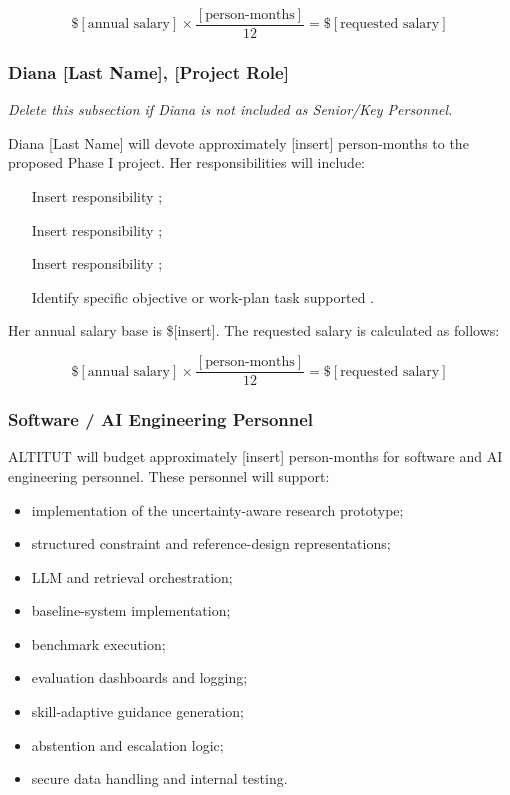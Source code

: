 \documentclass[11pt,letterpaper]{article}
\begin{document}
\[
\$[\text{annual salary}]
\times
\frac{[\text{person-months}]}{12}
=
\$[\text{requested salary}]
\]

\subsubsection*{Diana [Last Name], [Project Role]}

\textit{Delete this subsection if Diana is not included as Senior/Key
Personnel.}

Diana [Last Name] will devote approximately [insert] person-months to the
proposed Phase I project. Her responsibilities will include:

\begin{itemize}
    \item [Insert responsibility];
    \item [Insert responsibility];
    \item [Insert responsibility];
    \item [Identify specific objective or work-plan task supported].
\end{itemize}

Her annual salary base is \$[insert]. The requested salary is calculated as
follows:

\[
\$[\text{annual salary}]
\times
\frac{[\text{person-months}]}{12}
=
\$[\text{requested salary}]
\]

\subsubsection*{Software / AI Engineering Personnel}

ALTITUT will budget approximately [insert] person-months for software and AI
engineering personnel. These personnel will support:

\begin{itemize}
    \item implementation of the uncertainty-aware research prototype;
    \item structured constraint and reference-design representations;
    \item LLM and retrieval orchestration;
    \item baseline-system implementation;
    \item benchmark execution;
    \item evaluation dashboards and logging;
    \item skill-adaptive guidance generation;
    \item abstention and escalation logic;
    \item secure data handling and internal testing.
\end{itemize}
\end{document}
